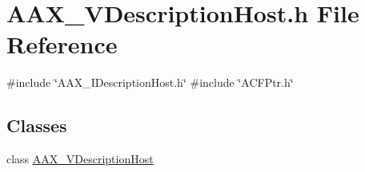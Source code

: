 \hypertarget{a00701}{}\section{A\+A\+X\+\_\+\+V\+Description\+Host.\+h File Reference}
\label{a00701}
{\ttfamily \#include \char`\"{}A\+A\+X\+\_\+\+I\+Description\+Host.\+h\char`\"{}}\newline
{\ttfamily \#include \char`\"{}A\+C\+F\+Ptr.\+h\char`\"{}}\newline
\subsection*{Classes}
\begin{DoxyCompactItemize}
\item 
class \mbox{\hyperlink{a01909}{A\+A\+X\+\_\+\+V\+Description\+Host}}
\end{DoxyCompactItemize}
